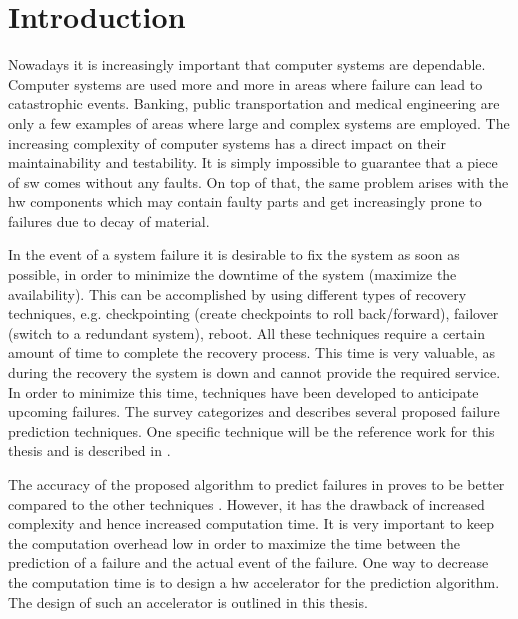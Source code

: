 \documentclass[mscthesis]{usiinfthesis}
\begin{document}
\tableofcontents 
\listoffigures %
\listoftables %

\mainmatter

\chapter{Introduction}
\label{ch:intro}
\glsresetall %

Nowadays it is increasingly important that computer systems are dependable.
Computer systems are used more and more in areas where failure can lead to
catastrophic events.  Banking, public transportation and medical engineering
are only a few examples of areas where large and complex systems are employed.
The increasing complexity of computer systems has a direct impact on their
maintainability and testability. It is simply impossible to guarantee that
a piece of \gls{sw} comes without any faults. On top of that, the same problem
arises with the \gls{hw} components which may contain faulty parts and get
increasingly prone to failures due to decay of material.

In the event of a system failure it is desirable to fix the system as soon as
possible, in order to minimize the downtime of the system (maximize the
availability). This can be accomplished by using different types of recovery
techniques, e.g. checkpointing (create checkpoints to roll back/forward),
failover (switch to a redundant system), reboot. All these techniques require
a certain amount of time to complete the recovery process. This time is very
valuable, as during the recovery the system is down and cannot provide the
required service. In order to minimize this time, techniques have been
developed to anticipate upcoming failures. The survey \cite{ACM10_Salfner}
categorizes and describes several proposed failure prediction techniques. One
specific technique will be the reference work for this thesis and is described
in \cite{salfner08}.

The accuracy of the proposed algorithm to predict failures in
\cite{salfner08} proves to be better compared to the other techniques
\cite{lin88, ICDM02_Vilalta, domeniconi02}. However, it has the drawback of
increased complexity and hence increased computation time. It is very important
to keep the computation overhead low in order to maximize the time between the
prediction of a failure and the actual event of the failure. One way to
decrease the computation time is to design a \gls{hw} accelerator for the
prediction algorithm. The design of such an accelerator is outlined in this
thesis.
\end{document}
